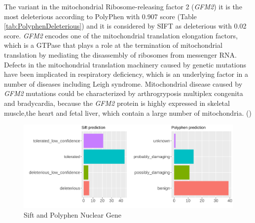 The variant  in the mitochondrial Ribosome-releasing factor 2 (\textit{GFM2}) it is the most deleterious according to PolyPhen with 0.907 score  (Table \ref{tab:PolyphenDeleterious}) and it is considered by SIFT as deleterious with 0.02 score.
\textit{GFM2} encodes one of the mitochondrial translation elongation factors, which is a GTPase that plays a role at the termination of mitochondrial translation by mediating the disassembly of ribosomes from messenger RNA. 
Defects in the mitochondrial translation machinery caused by
genetic mutations have been implicated in respiratory deficiency,
which is an underlying factor in a number of diseases including Leigh syndrome. 
Mitochondrial disease caused by \textit{GFM2} mutations could be characterized by arthrogryposis multiplex congenita and bradycardia, because the \textit{GFM2} protein is highly expressed in skeletal muscle,the heart and fetal liver, which contain a large number of mitochondria. (\cite{fukumura2015compound}) \\




\begin{figure}[h]
\includegraphics[width=\textwidth]{Fig/nuclear_SiftPoly.png}
\caption{Sift and Polyphen Nuclear Gene}
\label{fig:siftpolyphen_nuclear}
\end{figure}\\





